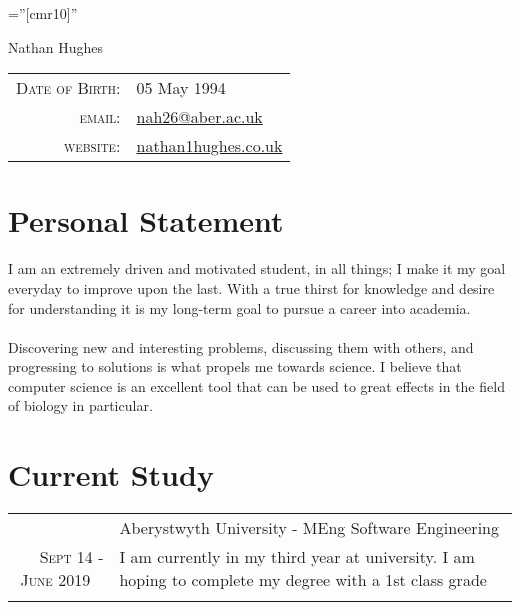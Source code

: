 \documentclass[a4paper,10pt]{article}
\begin{document}
\pagestyle{empty} %

\font\fb=''[cmr10]'' %

\par{\centering
  {\Huge Nathan {Hughes}
  }\bigskip\par}


\begin{center}
  \begin{tabular}{rl}
    \textsc{Date of Birth:} & 05 		May 1994 \\
    \textsc{email:}     & \href{mailto:nah26@aber.ac.uk}{nah26@aber.ac.uk}\\
    \textsc{website:}  & \href{nathan1hughes.co.uk}{nathan1hughes.co.uk}
                      
  \end{tabular}
\end{center}


\section{Personal Statement}
I am an extremely driven and motivated student, in all things; I make it my goal everyday to improve upon the last. With a true thirst for knowledge and desire for understanding it is my long-term goal to pursue a career into academia. \\
\\
Discovering new and interesting problems, discussing them with others, and progressing to solutions is what propels me towards science.
I believe that computer science is an excellent tool that can be used to great effects in the field of biology in particular.


\section{Current Study}


\begin{tabular}{rp{11cm}}
  &Aberystwyth University - MEng Software Engineering\\\textsc{Sept 14 - June 2019 \  }&\footnotesize{I am currently in my third year at university. I am hoping to complete my degree with a 1st class grade}\\\multicolumn{2}{c}{} \\
  


\end{tabular}
\end{document}
